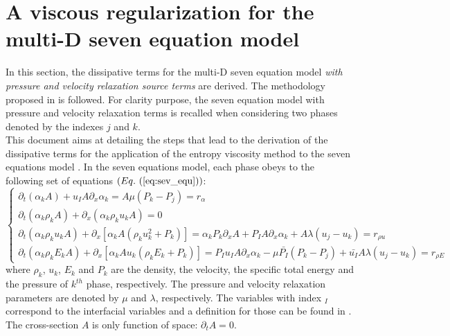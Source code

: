 \section{A viscous regularization for the multi-D seven equation model}\label{sec:sev-equ-visc-reg-sect4}
In this section, the dissipative terms for the multi-D seven equation model \emph{with pressure and velocity relaxation source terms} are derived. The methodology proposed in   is followed. For clarity purpose, the seven equation model with pressure and velocity relaxation terms is recalled when considering two phases denoted by the indexes $j$ and $k$.  \\

This document aims at detailing the steps that lead to the derivation of the dissipative terms for the application of the entropy viscosity method to the seven equations model \cite{SEM}. In the seven equations model, each phase obeys to the following set of equations $(\eqt{eq:sev_equ})$:
\begin{equation}
\label{eq:sev_equ}
\left\{
\begin{array}{llll}
\partial_t \left( \alpha_k  A\right) + u_I A \partial_x \alpha_k = A \mu \left( P_k - P_j \right) = r_{\alpha} \\
\partial_t \left( \alpha_k \rho_k A \right) + \partial_x \left( \alpha_k \rho_k u_k A \right) = 0 \\
\partial_t \left( \alpha_k \rho_k u_k A \right) + \partial_x \left[ \alpha_k A \left( \rho_k u_k^2 + P_k \right) \right] = \alpha_k P_k \partial_x A + P_I A \partial_x \alpha_k + A \lambda \left( u_j - u_k \right) = r_{\rho u} \\
\partial_t \left( \alpha_k \rho_k E_k A \right) + \partial_x \left[ \alpha_k A u_k \left( \rho_k E_k + P_k \right) \right] = P_I u_I A \partial_x \alpha_k - \mu \bar{P_I} \left( P_k-P_j \right) + \bar{u_I}A \lambda \left( u_j - u_k \right) = r_{\rho E}
\end{array}
\right.
\end{equation}
where $\rho_k$, $u_k$, $E_k$ and $P_k$ are the density, the velocity, the specific total energy and the pressure of $k^{th}$ phase, respectively. The pressure and velocity relaxation parameters are denoted by $\mu$ and $\lambda$, respectively. The variables with index $_I$ correspond to the interfacial variables and a definition for those can be found in \cite{SEM}. The cross-section $A$ is only function of space: $\partial_t A = 0$.
